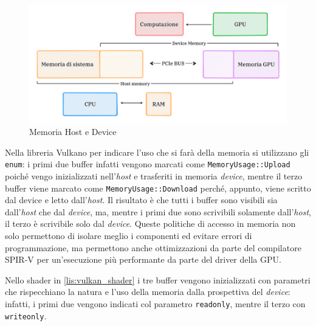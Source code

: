 \begin{figure}[ht]
    \centering
    \includegraphics[width=.9\linewidth]{images/chapter2/host_device_mem.png}
    \caption{Memoria Host e Device}
    \label{fig:host_device_mem}
\end{figure}

Nella libreria Vulkano per indicare l'uso che si farà della memoria si utilizzano gli \verb|enum|: i primi due buffer infatti vengono marcati come \verb|MemoryUsage::Upload| poiché vengo inizializzati nell'\textit{host} e trasferiti in memoria \textit{device}, mentre il terzo buffer viene marcato come \verb|MemoryUsage::Download| perché, appunto, viene scritto dal device e letto dall'\textit{host}. Il risultato è che tutti i buffer sono visibili sia dall'\textit{host} che dal \textit{device}, ma, mentre i primi due sono scrivibili solamente dall'\textit{host}, il terzo è scrivibile solo dal \textit{device}. Queste politiche di accesso in memoria non solo permettono di isolare meglio i componenti ed evitare errori di programmazione, ma permettono anche ottimizzazioni da parte del compilatore \gls{SPIR-V} per un'esecuzione più performante da parte del driver della \gls{GPU}.

Nello shader in \ref{lis:vulkan_shader} i tre buffer vengono inizializzati con parametri che rispecchiano la natura e l'uso della memoria dalla prospettiva del \textit{device}: infatti, i primi due vengono indicati col parametro \verb|readonly|, mentre il terzo con \verb|writeonly|.


